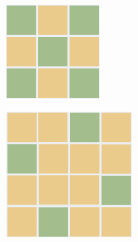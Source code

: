 \documentclass[12pt,leqno]{article}
\begin{document}
\begin{figure}[ht]
    \caption{פתרונות של משחק על לוחות שונים}
    \label{fig:sol_3_4_5}
    \centering
    \begin{subfigure}[b]{.25\linewidth}
    \includegraphics[width=0.95\linewidth]{images/3x3_sol.PNG}
    \end{subfigure}
    \begin{subfigure}[b]{.25\linewidth}
    \includegraphics[width=0.97\linewidth]{images/4x4_sol.PNG}

\end{subfigure}
\end{figure}
\end{document}

